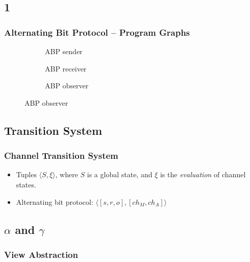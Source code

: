 \documentclass[handout]{beamer}
\begin{document}
\subsection*{1}
\begin{frame}
  \begin{example}
    \frametitle{Alternating Bit Protocol -- Program Graphs}
    \begin{figure}
      \begin{subfigure}[b]{0.49\textwidth}
        \abpsender
        \caption{\tiny ABP sender}
      \end{subfigure}
      \begin{subfigure}[b]{0.49\textwidth}
        \abpreceiver
        \caption{\tiny ABP receiver}
      \end{subfigure}
      \begin{subfigure}[b]{\textwidth}
        \center
        \abpobserver
        \caption{\tiny ABP observer}
      \end{subfigure}
    \end{figure}
  \end{example}
\end{frame}

\subsection{Transition System}
\begin{frame}
  \frametitle{Channel Transition System}
  \begin{itemize}
  \item
    Tuples $\langle S, \xi\rangle$, where $S$ is a global state, and $\xi$ is the \emph{evaluation} of channel states.
  \item
    Alternating bit protocol: $\langle [s, r, o], [ch_M, ch_A]\rangle$
  \end{itemize}
\end{frame}

\subsection{$\alpha$ and $\gamma$}
\begin{frame}
  \frametitle{View Abstraction} %
  \begin{exampleblock}{}
    \abstraction
  \end{exampleblock}
\end{frame}
\end{document}
